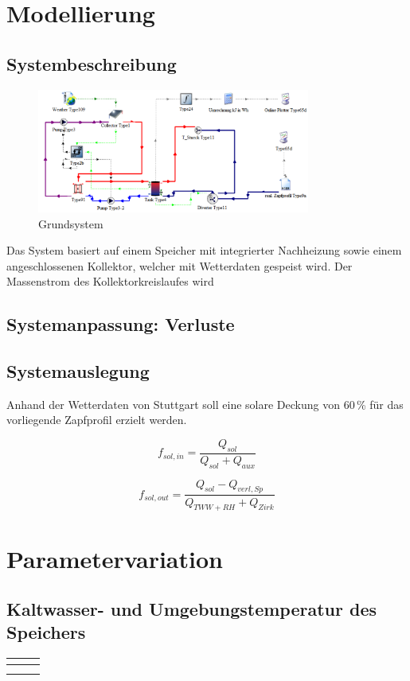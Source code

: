 \section{Modellierung}
\subsection{Systembeschreibung}
\begin{figure}[H]
	\centering
	\includegraphics[width=0.8\textwidth]{../DATA/std_deck.png}
	\caption[Grundsystem]{Grundsystem}
	\label{fig:std_deck}
\end{figure}

Das System basiert auf einem Speicher mit integrierter Nachheizung sowie einem angeschlossenen Kollektor, welcher mit Wetterdaten gespeist wird. Der Massenstrom des Kollektorkreislaufes wird 

\subsection{Systemanpassung: Verluste}


\subsection{Systemauslegung}
Anhand der Wetterdaten von Stuttgart soll eine solare Deckung von 60\,\% für das vorliegende Zapfprofil erzielt werden.

\begin{equation}
	\label{eq:fsolin}
	f_{sol,in} = \frac{Q_{sol}}{Q_{sol}+Q_{aux}}
\end{equation}

\begin{equation}
	\label{eq:}
	f_{sol,out} = \frac{Q_{sol}-Q_{verl,Sp}}{Q_{TWW+RH}+Q_{Zirk}}
\end{equation}
\section{Parametervariation}
\subsection{Kaltwasser- und Umgebungstemperatur des Speichers}
\begin{center}
	\begin{tabular}{l|c|c}
		\label{tab:}
		
		\textbf{} & \textbf{} & \textbf{}\\
		\hline
		&  & \\
		&  & \\
	\end{tabular}
\end{center}


